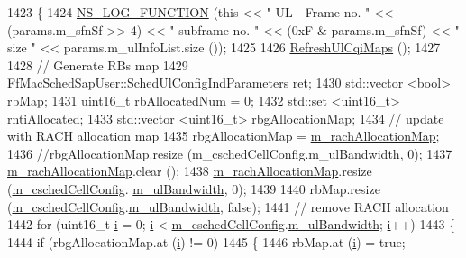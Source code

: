 \begin{DoxyCode}
1423 \{
1424   \hyperlink{log-macros-disabled_8h_a90b90d5bad1f39cb1b64923ea94c0761}{NS\_LOG\_FUNCTION} (\textcolor{keyword}{this} << \textcolor{stringliteral}{" UL - Frame no. "} << (params.m\_sfnSf >> 4) << \textcolor{stringliteral}{" subframe no. "} 
      << (0xF & params.m\_sfnSf) << \textcolor{stringliteral}{" size "} << params.m\_ulInfoList.size ());
1425 
1426   \hyperlink{classns3_1_1FdBetFfMacScheduler_a59ea108646e3cba6ac8df5068d2c9c9e}{RefreshUlCqiMaps} ();
1427 
1428   \textcolor{comment}{// Generate RBs map}
1429   FfMacSchedSapUser::SchedUlConfigIndParameters ret;
1430   std::vector <bool> rbMap;
1431   uint16\_t rbAllocatedNum = 0;
1432   std::set <uint16\_t> rntiAllocated;
1433   std::vector <uint16\_t> rbgAllocationMap;
1434   \textcolor{comment}{// update with RACH allocation map}
1435   rbgAllocationMap = \hyperlink{classns3_1_1FdBetFfMacScheduler_ac11ac1d239d1b52e4d7778b6265050f8}{m\_rachAllocationMap};
1436   \textcolor{comment}{//rbgAllocationMap.resize (m\_cschedCellConfig.m\_ulBandwidth, 0);}
1437   \hyperlink{classns3_1_1FdBetFfMacScheduler_ac11ac1d239d1b52e4d7778b6265050f8}{m\_rachAllocationMap}.clear ();
1438   \hyperlink{classns3_1_1FdBetFfMacScheduler_ac11ac1d239d1b52e4d7778b6265050f8}{m\_rachAllocationMap}.resize (\hyperlink{classns3_1_1FdBetFfMacScheduler_a52a10018d36c6a2e69820346a327dfc9}{m\_cschedCellConfig}.
      \hyperlink{structns3_1_1FfMacCschedSapProvider_1_1CschedCellConfigReqParameters_a5ab5b102878e6e7e7727a14af4a64d2f}{m\_ulBandwidth}, 0);
1439 
1440   rbMap.resize (\hyperlink{classns3_1_1FdBetFfMacScheduler_a52a10018d36c6a2e69820346a327dfc9}{m\_cschedCellConfig}.\hyperlink{structns3_1_1FfMacCschedSapProvider_1_1CschedCellConfigReqParameters_a5ab5b102878e6e7e7727a14af4a64d2f}{m\_ulBandwidth}, \textcolor{keyword}{false});
1441   \textcolor{comment}{// remove RACH allocation}
1442   \textcolor{keywordflow}{for} (uint16\_t \hyperlink{bernuolliDistribution_8m_a6f6ccfcf58b31cb6412107d9d5281426}{i} = 0; \hyperlink{bernuolliDistribution_8m_a6f6ccfcf58b31cb6412107d9d5281426}{i} < \hyperlink{classns3_1_1FdBetFfMacScheduler_a52a10018d36c6a2e69820346a327dfc9}{m\_cschedCellConfig}.\hyperlink{structns3_1_1FfMacCschedSapProvider_1_1CschedCellConfigReqParameters_a5ab5b102878e6e7e7727a14af4a64d2f}{m\_ulBandwidth}; 
      \hyperlink{bernuolliDistribution_8m_a6f6ccfcf58b31cb6412107d9d5281426}{i}++)
1443     \{
1444       \textcolor{keywordflow}{if} (rbgAllocationMap.at (\hyperlink{bernuolliDistribution_8m_a6f6ccfcf58b31cb6412107d9d5281426}{i}) != 0)
1445         \{
1446           rbMap.at (\hyperlink{bernuolliDistribution_8m_a6f6ccfcf58b31cb6412107d9d5281426}{i}) = \textcolor{keyword}{true};

\end{DoxyCode}
